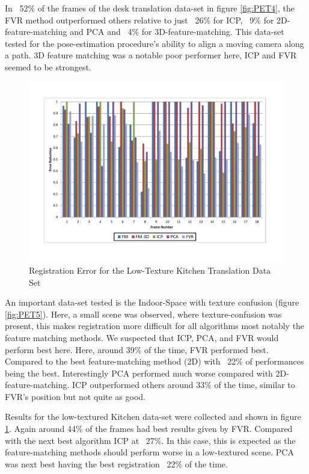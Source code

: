 In ~52\% of the frames of the desk translation data-set in figure \ref{fig:PET4}, the FVR method outperformed others relative to just ~26\% for ICP, ~9\% for 2D-feature-matching and PCA and ~4\% for 3D-feature-matching. This data-set tested for the pose-estimation procedure's ability to align a moving camera along a path. 3D feature matching was a notable poor performer here, ICP and FVR seemed to be strongest. 


\begin{figure}[t]
\centering
\includegraphics[width=6.0in]{images/results/Kitchen_LittleTexture_Pan}
\caption{Registration Error for the Low-Texture Kitchen Translation Data Set}
\label{fig:PET6}
\end{figure}

An important data-set tested is the Indoor-Space with texture confusion (figure \ref{fig:PET5}). Here, a small scene was observed, where texture-confusion was present, this makes registration more difficult for all algorithms most notably the feature matching methods. We suspected that ICP, PCA, and FVR would perform best here. Here, around 39\% of the time, FVR performed best. Compared to the best feature-matching method (2D) with ~22\% of performances being the best. Interestingly PCA performed much worse compared with 2D-feature-matching. ICP outperformed others around 33\% of the time, similar to FVR's position but not quite as good. 

Results for the low-textured Kitchen data-set were collected and shown in figure \ref{fig:PET6}. Again around 44\% of the frames had best results given by FVR. Compared with the next best algorithm ICP at ~27\%. In this case, this is expected as the feature-matching methods should perform worse in a low-textured scene. PCA was next best having the best registration ~22\% of the time.

